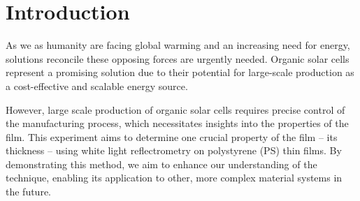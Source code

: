 

\chapter{Introduction}
\label{chap:einleitung}

As we as humanity are facing global warming and an increasing need for energy, solutions reconcile these opposing forces are urgently needed. Organic solar cells represent a promising solution due to their potential for large-scale production as a cost-effective and scalable energy source.


However, large scale production of organic solar cells requires precise control of the manufacturing process, which necessitates insights into the properties of the film. This experiment aims to determine one crucial property of the film -- its thickness -- using white light reflectrometry on polystyrene (PS) thin films.  By demonstrating this method, we aim to enhance our understanding of the technique, enabling its application to other, more complex material systems in the future.


